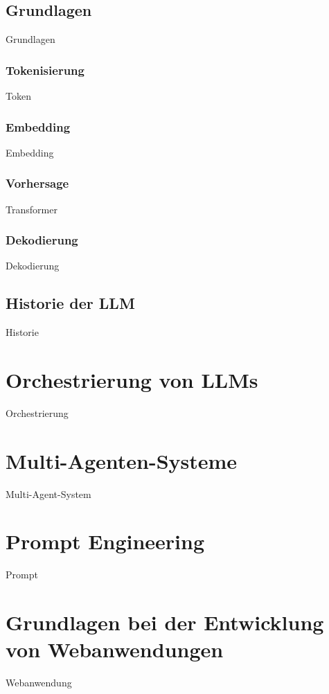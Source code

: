 \subsection{Grundlagen}
Grundlagen

\subsubsection{Tokenisierung}
Token

\subsubsection{Embedding}
Embedding

\subsubsection{Vorhersage}
Transformer

\subsubsection{Dekodierung}
Dekodierung

\subsection{Historie der LLM}
Historie



\section{Orchestrierung von LLMs}
Orchestrierung

\section{Multi-Agenten-Systeme}
Multi-Agent-System

\section{Prompt Engineering}
Prompt

\section{Grundlagen bei der Entwicklung von Webanwendungen}
Webanwendung
